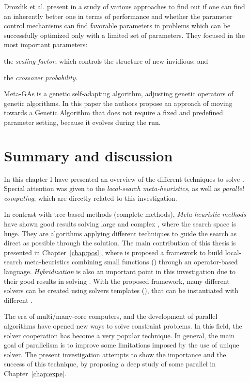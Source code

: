 Drozdik et al. present in \cite{Drozdik} a study of various approaches to find out if one can find an inherently better one in terms of performance and whether the parameter control mechanisms can find favorable parameters in problems which can be successfully optimized only with a limited set of parameters. They focused in the most important parameters: 
\begin{inparaenum}[1)]
\item the \textit{scaling factor}, which controls the structure of new invidious; and
\item the \textit{crossover probability}.
\end{inparaenum}

{\sc Meta-GAs} \cite{Clune2005} is a genetic self-adapting algorithm, adjusting genetic operators of genetic algorithms. In this paper the authors propose an approach of moving towards a Genetic Algorithm that does not require a fixed and predefined parameter setting, because it evolves during the run.

\section{Summary and discussion}

In this chapter I have presented an overview of the different techniques to solve \CSPs{}. Special attention was given to the \textit{local-search meta-heuristics}, as well as \textit{parallel computing}, which are directly related to this investigation.

In contrast with tree-based methods (complete methods), \textit{Meta-heuristic methods} have shown good results solving large and complex \csps, where the search space is huge. They are algorithms applying different techniques to guide the search as direct as possible through the solution. The main contribution of this thesis is presented in Chapter~\ref{chap:posl}, where is proposed a framework to build local-search meta-heuristics combining small functions (\oms) through an operator-based language. \textit{Hybridization} is also an important point in this investigation due to their good results in solving \csps. With the proposed framework, many different solvers can be created using solvers templates (\ass), that can be instantiated with different \oms.

The era of multi/many-core computers, and the development of parallel algorithms have opened new ways to solve constraint problems. In this field, the solver cooperation has become a very popular technique. In general, the main goal of parallelism is to improve some limitations imposed by the use of unique solver. The present investigation attempts to show the importance and the success of this technique, by proposing a deep study of some parallel \comstrs{} in Chapter~\ref{chap:expe}.